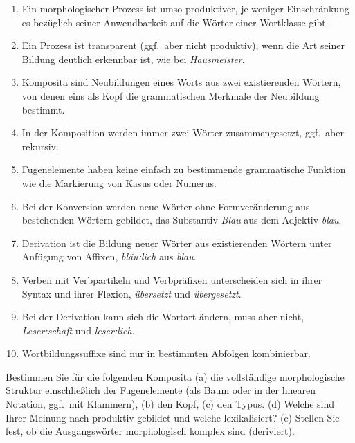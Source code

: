 \Zusammenfassung

\begin{enumerate}
  \item Ein morphologischer Prozess ist umso produktiver, je weniger Einschränkung es bezüglich seiner Anwendbarkeit auf die Wörter einer Wortklasse gibt.
  \item Ein Prozess ist transparent (ggf.\ aber nicht produktiv), wenn die Art seiner Bildung deutlich erkennbar ist, wie bei \textit{Hausmeister}.
  \item Komposita sind Neubildungen eines Worts aus zwei existierenden Wörtern, von denen eins als Kopf die grammatischen Merkmale der Neubildung bestimmt.
  \item In der Komposition werden immer zwei Wörter zusammengesetzt, ggf.\ aber rekursiv.
  \item Fugenelemente haben keine einfach zu bestimmende grammatische Funktion wie die Markierung von Kasus oder Numerus.
  \item Bei der Konversion werden neue Wörter ohne Formveränderung aus bestehenden Wörtern gebildet, \zB das Substantiv \textit{Blau} aus dem Adjektiv \textit{blau}.
  \item Derivation ist die Bildung neuer Wörter aus existierenden Wörtern unter Anfügung von Affixen, \zB \textit{bläu:lich} aus \textit{blau}.
  \item Verben mit Verbpartikeln und Verbpräfixen unterscheiden sich in ihrer Syntax und ihrer Flexion, \zB \textit{übersetzt} und \textit{übergesetzt}.
  \item Bei der Derivation kann sich die Wortart ändern, muss aber nicht, \zB \textit{Leser:schaft} und \textit{leser:lich}.
  \item Wortbildungssuffixe sind nur in bestimmten Abfolgen kombinierbar.
\end{enumerate}

\Uebungen

\Uebung \label{u71} Bestimmen Sie für die folgenden Komposita (a) die vollständige morphologische Struktur einschließlich der Fugenelemente (als Baum oder in der linearen Notation, ggf.\ mit Klammern), (b) den Kopf, (c) den Typus. (d) Welche sind Ihrer Meinung nach produktiv gebildet und welche lexikalisiert? (e) Stellen Sie fest, ob die Ausgangswörter morphologisch komplex sind (\zB deriviert).


